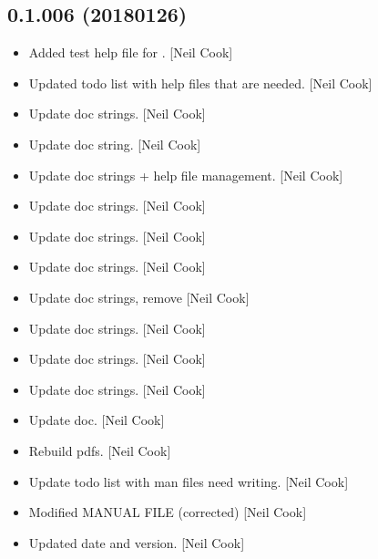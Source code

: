 \documentclass[a4paper,10pt,english]{report}
\begin{document}
\subsection{0.1.006 (2018\sphinxhyphen{}01\sphinxhyphen{}26)}
\label{\detokenize{misc/changelog:id516}}\begin{itemize}
\item {} 
Added test help file \sphinxhyphen{} for . {[}Neil Cook{]}

\item {} 
Updated todo list with help files that are needed. {[}Neil Cook{]}

\item {} 
Update doc strings. {[}Neil Cook{]}

\item {} 
Update doc string. {[}Neil Cook{]}

\item {} 
Update doc strings + help file management. {[}Neil Cook{]}

\item {} 
Update doc strings. {[}Neil Cook{]}

\item {} 
Update doc strings. {[}Neil Cook{]}

\item {} 
Update doc strings. {[}Neil Cook{]}

\item {} 
Update doc strings, remove  {[}Neil Cook{]}

\item {} 
Update doc strings. {[}Neil Cook{]}

\item {} 
Update doc strings. {[}Neil Cook{]}

\item {} 
Update doc strings. {[}Neil Cook{]}

\item {} 
Update doc. {[}Neil Cook{]}

\item {} 
Rebuild pdfs. {[}Neil Cook{]}

\item {} 
Update todo list with man files need writing. {[}Neil Cook{]}

\item {} 
Modified MANUAL FILE (corrected) {[}Neil Cook{]}

\item {} 
Updated date and version. {[}Neil Cook{]}


\end{itemize}
\end{document}
